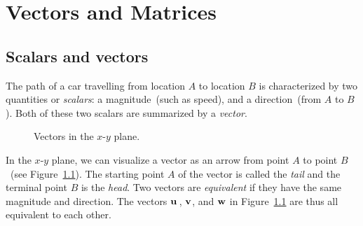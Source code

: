 
\chapter{Vectors and Matrices}



\section{Scalars and vectors}
\label{sec:scalars_vectors}

The path of a car travelling from location $A$ to location $B$ is
characterized by two quantities or \emph{scalars}: a
magnitude~(such as speed), and a direction~(from $A$
to $B$). Both of these two scalars are summarized by a
\emph{vector}.

\begin{figure}[!htpb]
\centering
{}
\caption{Vectors in the $x$-$y$ plane.}
\label{fig:vectors_matrices:plane_vectors}
\end{figure}

In the $x$-$y$ plane, we can visualize a vector as an arrow from point
$A$ to point $B$~(see
Figure~\ref{fig:vectors_matrices:plane_vectors}). The starting point
$A$ of the vector is called the \emph{tail} and
the terminal point $B$ is the \emph{head}. Two
vectors are \emph{equivalent} if they have
the same magnitude and direction. The vectors $\operatorname*{\mathbf{u}}{}$, $\operatorname*{\mathbf{v}}$, and
$\operatorname*{\mathbf{w}}$ in Figure~\ref{fig:vectors_matrices:plane_vectors} are thus
all equivalent to each other.

